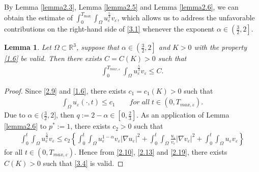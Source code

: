 \documentclass[12pt]{article}
\theoremstyle{plain}
\newtheorem{lemma}{Lemma}[section]
\theoremstyle{definition}
\numberwithin{equation}{section}
\begin{document}
By Lemma \ref{lemma2.3}, Lemma \ref{lemma2.5} and Lemma \ref{lemma2.6}, we can obtain the estimate of $\int_0^{T_{\max}}\int_\Omega u_{\varepsilon}^{\frac{5}{3}}v_{\varepsilon}$, which allows us to address the unfavorable contributions on the right-hand side of \eqref{3.1} whenever the exponent $\alpha\in\left(\frac{3}{2},2\right]$.
\begin{lemma} \label{lemma3.2}
Let $\Omega \subset \mathbb R^3$, suppose that $\alpha\in\left(\frac{3}{2},2\right]$ and $K>0$ with the
property \eqref{1.6} be valid. Then there exists  $C=C(K)>0$ such that
\begin{align}\label{3.4}
    \int_0^{T_{max,\varepsilon}}\int_{\Omega}u_{\varepsilon}^{\frac{5}{3}}v_{\varepsilon}\leq C.
\end{align}
\end{lemma}
\begin{proof}
    Since \eqref{2.9} and \eqref{1.6}, there exists $c_1=c_1(K)>0$ such that
    \begin{align*}
        \int_{\Omega}u_{\varepsilon}(\cdot,t)\leq c_1 \qquad for\; all\; t\in(0,T_{max,\varepsilon}).
    \end{align*}
  Due to $\alpha\in(\frac{3}{2},2]$, then $q:=2-\alpha\in[0,\frac{2}{3}]$. As an application of Lemma \ref{lemma2.6} to $p^*:=1$,  there exists $c_2>0$
   such that
   \begin{align*}
    \int_0^{t}\int_{\Omega}u_{\varepsilon}^{\frac{5}{3}}v_{\varepsilon}\leq c_2
    \left\{\int_0^{t}\int_{\Omega}u_{\varepsilon}^{1-\alpha}v_{\varepsilon}|\nabla
    u_{\varepsilon}|^2+\int_0^{t}\int_{\Omega}\frac{u_{\varepsilon}}{v_{\varepsilon}}|\nabla
    v_{\varepsilon}|^2+\int_0^{t}\int_{\Omega}u_{\varepsilon}v_{\varepsilon}\right\}
\end{align*}
for all $t \in(0, T_{max, \varepsilon})$. Hence from \eqref{2.10}, \eqref{2.13} and \eqref{2.19}, there exists  $C(K)>0$ such that \eqref{3.4} is valid.
\end{proof}
\end{document}
